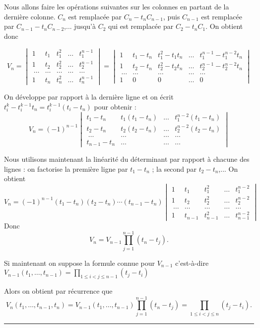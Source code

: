 \documentclass[11pt,a4paper]{article}
\renewcommand{\le}{\leqslant} \renewcommand{\leq}{\leqslant}
\newcommand{\fincorrection}{\vspace{1mm}\hrule\vspace*{7mm}}
\begin{document}
Nous allons faire les opérations suivantes sur les colonnes
en partant de la dernière colonne.
$C_n$ est remplacée par $C_n-t_n C_{n-1}$,
puis $C_{n-1}$ est remplacée par $C_{n-1}-t_n C_{n-2}$,...
jusqu'à $C_2$ qui est remplacée par $C_2-t_nC_1$.
On obtient donc

$$V_n=\begin{vmatrix}
1 & t_1 & t_1^2 & \ldots & t_1^{n-1} \\
1 & t_2 & t_2^2 & \ldots & t_2^{n-1} \\\
\ldots&\ldots&\ldots& \ldots & \ldots \\
1 & t_n & t_n^2 & \ldots & t_n^{n-1}
\end{vmatrix} 
= 
\begin{vmatrix}
1 & t_1-t_n & t_1^2-t_1t_n & \ldots & t_1^{n-1}-t_1^{n-2}t_n \\
1 & t_2-t_n & t_2^2-t_2t_n & \ldots & t_2^{n-1}-t_2^{n-2}t_n \\\
\ldots&\ldots&\ldots& \ldots & \ldots \\
1 & 0 & 0 & \ldots & 0
\end{vmatrix}
$$

On développe par rapport à la dernière ligne et on écrit $t_i^k-t_i^{k-1}t_n=t_i^{k-1}(t_i-t_n)$ pour obtenir :
$$V_n = (-1)^{n-1}\begin{vmatrix}
 t_1-t_n & t_1(t_1-t_n) & \ldots & t_1^{n-2}(t_1-t_n) \\
 t_2-t_n & t_2(t_2-t_n) & \ldots & t_2^{n-2}(t_2-t_n) \\\
\ldots&\ldots& \ldots & \ldots \\
 t_{n-1}-t_n & \ldots & \ldots & \ldots
\end{vmatrix}$$

Nous utilisons maintenant la linéarité du déterminant par rapport à chacune des lignes :
on factorise la première ligne par $t_1-t_n$ ; la second par $t_2-t_n$,...
On obtient 
$$V_n = (-1)^{n-1}(t_1-t_n)(t_2-t_n)\cdots(t_{n-1}-t_n)
\begin{vmatrix}
1 & t_1 & t_1^2 & \ldots & t_1^{n-2} \\
1 & t_2 & t_2^2 & \ldots & t_2^{n-2} \\\
\ldots&\ldots&\ldots& \ldots & \ldots \\
1 & t_{n-1} & t_{n-1}^2 & \ldots & t_{n-1}^{n-2}
\end{vmatrix} 
$$
Donc $$V_n = V_{n-1}\prod_{j=1}^{n-1}(t_n-t_j).$$

Si maintenant on suppose la formule connue pour $V_{n-1}$
c'est-à-dire $V_{n-1}(t_1,\ldots,t_{n-1})
= \prod_{1 \le i < j \le n-1} (t_j - t_i)$

Alors on obtient par récurrence que
$$V_n(t_1,\ldots,t_{n-1},t_n)= V_{n-1}(t_1,\ldots,t_{n-1})\prod_{j=1}^{n-1}(t_n-t_j) =  \prod_{1 \le i < j \le n} (t_j - t_i).$$

\fincorrection
\end{document}
